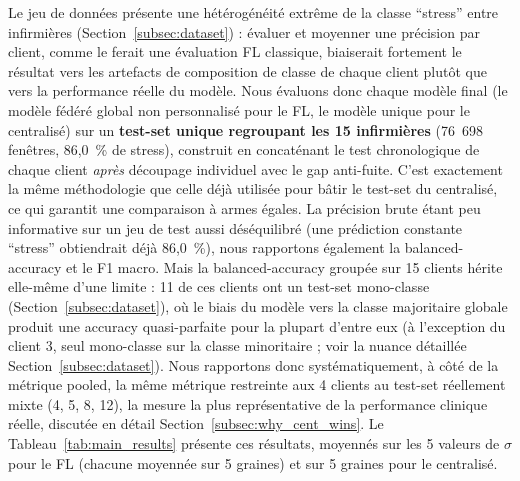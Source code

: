 \documentclass{article}
\begin{document}
Le jeu de données présente une hétérogénéité extrême de la classe ``stress'' entre
infirmières (Section~\ref{subsec:dataset}) : évaluer et moyenner une précision par
client, comme le ferait une évaluation FL classique, biaiserait fortement le résultat
vers les artefacts de composition de classe de chaque client plutôt que vers la
performance réelle du modèle. Nous évaluons donc chaque modèle final (le modèle
fédéré global non personnalisé pour le FL, le modèle unique pour le centralisé) sur
un \textbf{test-set unique regroupant les 15 infirmières} (76~698 fenêtres, 86,0~\%
de stress), construit en concaténant le test chronologique de chaque client
\emph{après} découpage individuel avec le gap anti-fuite. C'est exactement la même
méthodologie que celle déjà utilisée pour bâtir le test-set du centralisé, ce qui
garantit une comparaison à armes égales. La précision brute étant peu informative sur un
jeu de test aussi déséquilibré (une prédiction constante ``stress'' obtiendrait déjà
86,0~\%), nous rapportons également la balanced-accuracy et le F1 macro. Mais la
balanced-accuracy groupée sur 15 clients hérite elle-même d'une limite : 11 de ces
clients ont un test-set mono-classe (Section~\ref{subsec:dataset}), où le biais du
modèle vers la classe majoritaire globale produit une accuracy quasi-parfaite pour la
plupart d'entre eux (à l'exception du client 3, seul mono-classe sur la classe
minoritaire ; voir la nuance détaillée Section~\ref{subsec:dataset}). Nous rapportons donc systématiquement,
à côté de la métrique pooled, la même métrique restreinte aux 4 clients au test-set
réellement mixte (4, 5, 8, 12), la mesure la plus représentative de la performance
clinique réelle, discutée en détail Section~\ref{subsec:why_cent_wins}.
Le Tableau~\ref{tab:main_results} présente ces résultats, moyennés sur les 5 valeurs de
$\sigma$ pour le FL (chacune moyennée sur 5 graines) et sur 5 graines pour le
centralisé.
\end{document}
